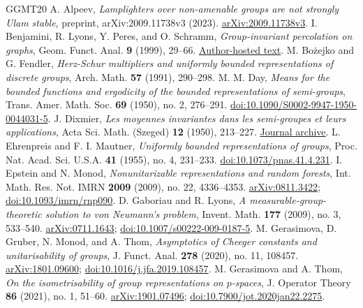 \documentclass[a4paper,11pt]{amsproc}
\numberwithin{equation}{section}
\theoremstyle{definition}
\begin{document}
\enlargethispage{2\baselineskip}
\begin{thebibliography}{GGMT20}
 A. Alpeev, \emph{Lamplighters over non-amenable groups are not strongly Ulam stable}, preprint, arXiv:2009.11738v3 (2023). \href{https://arxiv.org/abs/2009.11738v3}{arXiv:2009.11738v3}.
 I. Benjamini, R. Lyons, Y. Peres, and O. Schramm, \emph{Group-invariant percolation on graphs}, Geom. Funct. Anal. \textbf{9} (1999), 29--66. \href{https://rdlyons.pages.iu.edu/pdf/invar.pdf}{Author-hosted text}.
 M. Bo\.{z}ejko and G. Fendler, \emph{Herz-Schur multipliers and uniformly bounded representations of discrete groups}, Arch. Math. \textbf{57} (1991), 290--298.
 M. M. Day, \emph{Means for the bounded functions and ergodicity of the bounded representations of semi-groups}, Trans. Amer. Math. Soc. \textbf{69} (1950), no. 2, 276--291. \href{https://doi.org/10.1090/S0002-9947-1950-0044031-5}{doi:10.1090/S0002-9947-1950-0044031-5}.
 J. Dixmier, \emph{Les moyennes invariantes dans les semi-groupes et leurs applications}, Acta Sci. Math. (Szeged) \textbf{12} (1950), 213--227. \href{https://acta.bibl.u-szeged.hu/13605/}{Journal archive}.
 L. Ehrenpreis and F. I. Mautner, \emph{Uniformly bounded representations of groups}, Proc. Nat. Acad. Sci. U.S.A. \textbf{41} (1955), no. 4, 231--233. \href{https://doi.org/10.1073/pnas.41.4.231}{doi:10.1073/pnas.41.4.231}.
 I. Epstein and N. Monod, \emph{Nonunitarizable representations and random forests}, Int. Math. Res. Not. IMRN \textbf{2009} (2009), no. 22, 4336--4353. \href{https://arxiv.org/abs/0811.3422}{arXiv:0811.3422}; \href{https://doi.org/10.1093/imrn/rnp090}{doi:10.1093/imrn/rnp090}.
 D. Gaboriau and R. Lyons, \emph{A measurable-group-theoretic solution to von Neumann's problem}, Invent. Math. \textbf{177} (2009), no. 3, 533--540. \href{https://arxiv.org/abs/0711.1643}{arXiv:0711.1643}; \href{https://doi.org/10.1007/s00222-009-0187-5}{doi:10.1007/s00222-009-0187-5}.
 M. Gerasimova, D. Gruber, N. Monod, and A. Thom, \emph{Asymptotics of Cheeger constants and unitarisability of groups}, J. Funct. Anal. \textbf{278} (2020), no. 11, 108457. \href{https://arxiv.org/abs/1801.09600}{arXiv:1801.09600}; \href{https://doi.org/10.1016/j.jfa.2019.108457}{doi:10.1016/j.jfa.2019.108457}.
 M. Gerasimova and A. Thom, \emph{On the isometrisability of group representations on $p$-spaces}, J. Operator Theory \textbf{86} (2021), no. 1, 51--60. \href{https://arxiv.org/abs/1901.07496}{arXiv:1901.07496}; \href{https://doi.org/10.7900/jot.2020jan22.2275}{doi:10.7900/jot.2020jan22.2275}.

\end{thebibliography}
\end{document}
